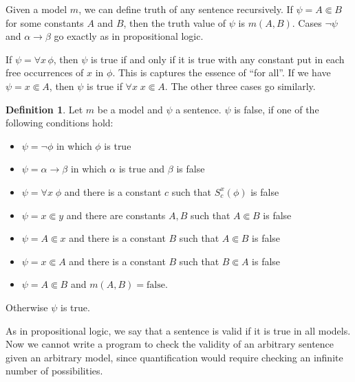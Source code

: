 \documentclass[11pt,oneside,%
]{memoir}
\theoremstyle{definition}
\newtheorem{maaritelma}{Definition}
\begin{document}
Given a model \(m\), we can define truth of any sentence recursively. If \(\psi=A\Subset B\) for some constants \(A\) and \(B\), then the truth value of \(\psi\) is \(m(A,B)\). Cases \(\neg\psi\) and \(\alpha\rightarrow\beta\) go exactly as in propositional logic.

If \(\psi=\forall x\,\phi\), then \(\psi\) is true if and only if it is true with any constant put in each free occurrences of \(x\) in \(\phi\). This is captures the essence of ``for all''. If we have \(\psi=x\Subset A\), then \(\psi\) is true if \(\forall x\;x\Subset A\). The other three cases go similarly.
\begin{maaritelma}%
Let \(m\) be a model and \(\psi\) a sentence. \(\psi\) is false, if one of the following conditions hold:
\begin{itemize}
    \item \(\psi=\neg\phi\) in which \(\phi\) is true
    \item \(\psi=\alpha\rightarrow\beta\) in which \(\alpha\) is true and \(\beta\) is false
    \item \(\psi=\forall x\;\phi\) and there is a constant \(c\) such that \(S_c^x(\phi)\) is false
    \item \(\psi=x\Subset y\) and there are constants \(A,B\) such that \(A\Subset B\) is false
    \item \(\psi=A\Subset x\) and there is a constant \(B\) such that \(A\Subset B\) is false
    \item \(\psi=x\Subset A\) and there is a constant \(B\) such that \(B\Subset A\) is false
    \item \(\psi=A\Subset B\) and \(m(A,B)=\text{false}\).
\end{itemize}
Otherwise \(\psi\) is true.
\end{maaritelma}
As in propositional logic, we say that a sentence is valid if it is true in all models. Now we cannot write a program to check the validity of an arbitrary sentence given an arbitrary model, since quantification would require checking an infinite number of possibilities.
\end{document}
